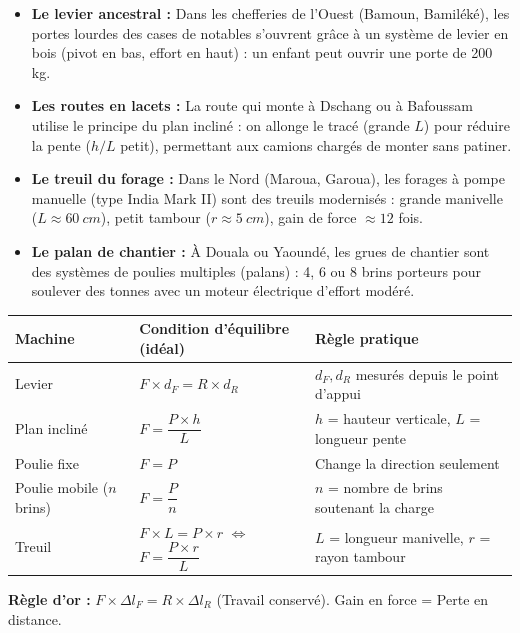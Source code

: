 \documentclass[11pt]{article}
\begin{document}
\begin{savaistu}
\begin{itemize}
\item \textbf{Le levier ancestral :} Dans les chefferies de l'Ouest (Bamoun, Bamiléké), les portes lourdes des cases de notables s'ouvrent grâce à un système de levier en bois (pivot en bas, effort en haut) : un enfant peut ouvrir une porte de 200 kg.
\item \textbf{Les routes en lacets :} La route qui monte à Dschang ou à Bafoussam utilise le principe du plan incliné : on allonge le tracé (grande $L$) pour réduire la pente ($h/L$ petit), permettant aux camions chargés de monter sans patiner.
\item \textbf{Le treuil du forage :} Dans le Nord (Maroua, Garoua), les forages à pompe manuelle (type India Mark II) sont des treuils modernisés : grande manivelle ($L \approx \SI{60}{cm}$), petit tambour ($r \approx \SI{5}{cm}$), gain de force $\approx 12$ fois.
\item \textbf{Le palan de chantier :} À Douala ou Yaoundé, les grues de chantier sont des systèmes de poulies multiples (palans) : 4, 6 ou 8 brins porteurs pour soulever des tonnes avec un moteur électrique d'effort modéré.
\end{itemize}
\end{savaistu}

\begin{aretenir}
\begin{center}
\begin{tabularx}{\linewidth}{|l|X|X|}\hline
\textbf{Machine} & \textbf{Condition d'équilibre (idéal)} & \textbf{Règle pratique} \\ \hline
Levier & $F \times d_F = R \times d_R$ & $d_F, d_R$ mesurés depuis le point d'appui \\ \hline
Plan incliné & $F = \dfrac{P \times h}{L}$ & $h$ = hauteur verticale, $L$ = longueur pente \\ \hline
Poulie fixe & $F = P$ & Change la direction seulement \\ \hline
Poulie mobile ($n$ brins) & $F = \dfrac{P}{n}$ & $n$ = nombre de brins soutenant la charge \\ \hline
Treuil & $F \times L = P \times r$ $\Leftrightarrow$ $F = \dfrac{P \times r}{L}$ & $L$ = longueur manivelle, $r$ = rayon tambour \\ \hline
\end{tabularx}
\end{center}
\textbf{Règle d'or :} $F \times \Delta l_F = R \times \Delta l_R$ (Travail conservé). Gain en force = Perte en distance.
\end{aretenir}
\end{document}
